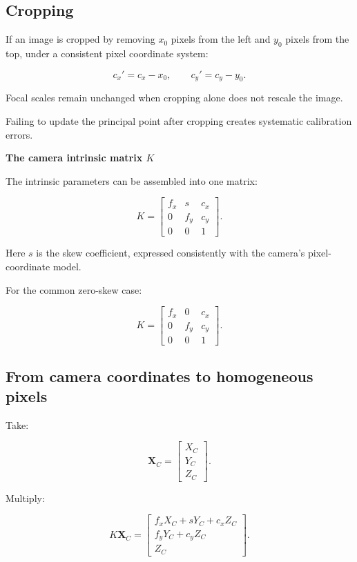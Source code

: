 \subsection{Cropping}\label{02-foundations-ii-ch034-cropping}

If an image is cropped by removing \(x_0\) pixels from the left and \(y_0\) pixels from the top, under a consistent pixel coordinate system:

\[
 \boxed{ c_x'=c_x-x_0, \qquad c_y'=c_y-y_0 }.
\]

Focal scales remain unchanged when cropping alone does not rescale the image.

Failing to update the principal point after cropping creates systematic calibration errors.

\textbf{The camera intrinsic matrix \(K\)}

The intrinsic parameters can be assembled into one matrix:

\[
 \boxed{ K= \begin{bmatrix} f_x&s&c_x\\ 0&f_y&c_y\\ 0&0&1 \end{bmatrix} }.
\]

Here \(s\) is the skew coefficient, expressed consistently with the camera's pixel-coordinate model.

For the common zero-skew case:

\[
 \boxed{ K= \begin{bmatrix} f_x&0&c_x\\ 0&f_y&c_y\\ 0&0&1 \end{bmatrix} }.
\]

\subsection{From camera coordinates to homogeneous pixels}\label{02-foundations-ii-ch034-from-camera-coordinates-to-homogeneous-pixels}

Take:

\[
 \mathbf X_C= \begin{bmatrix} X_C\\Y_C\\Z_C \end{bmatrix}.
\]

Multiply:

\[
 K\mathbf X_C= \begin{bmatrix} f_xX_C+sY_C+c_xZ_C\\ f_yY_C+c_yZ_C\\ Z_C \end{bmatrix}.
\]

